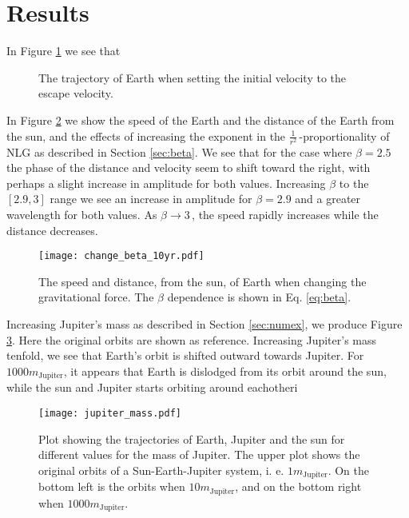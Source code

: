 \section{Results}
\label{sec:results}



In Figure \ref{fig:earth escape} we see that
\begin{figure}[htbp]
	\centering
	\caption{The trajectory of Earth when setting the initial velocity to the escape velocity.}
	\label{fig:earth escape}
\end{figure}

In Figure \ref{fig:changing beta} we show the speed of the Earth and the distance of the Earth from the sun, and the effects of increasing the exponent in the $\frac{1}{r^2}\,$-proportionality of NLG as described in Section \ref{sec:beta}. We see that for the case where $\beta=2.5$ the phase of the distance and velocity seem to shift toward the right, with perhaps a slight increase in amplitude for both values. Increasing $\beta$ to the $[2.9, 3]$ range we see an increase in amplitude for $\beta = 2.9$ and a greater wavelength for both values. As $\beta \rightarrow 3\,$, the speed rapidly increases while the distance decreases.
\begin{figure}[htbp]
	\centering
	\texttt{[image: change\_beta\_10yr.pdf]}
	\caption{The speed and distance, from the sun, of Earth when changing the gravitational force. The $\beta$ dependence is shown in Eq. \ref{eq:beta}.}
	\label{fig:changing beta}
\end{figure}

Increasing Jupiter's mass as described in Section \ref{sec:numex}, we produce Figure \ref{fig:jupiter mass}. Here the original orbits are shown as reference. Increasing Jupiter's mass tenfold, we see that Earth's orbit is shifted outward towards Jupiter.
For $1000m_{\text{Jupiter}}$, it appears that Earth is dislodged from its orbit around the sun, while the sun and Jupiter starts orbiting around eachotheri
\begin{figure}[htbp]
	\centering
	\texttt{[image: jupiter\_mass.pdf]}
	\caption{Plot showing the trajectories of Earth, Jupiter and the sun for different values for the mass of Jupiter. The upper plot shows the original orbits of a Sun-Earth-Jupiter system, i. e. $1m_{\text{Jupiter}}$. On the bottom left is the orbits when $10m_{\text{Jupiter}}$, and on the bottom right when $1000m_{\text{Jupiter}}$.}
	\label{fig:jupiter mass}
\end{figure}

